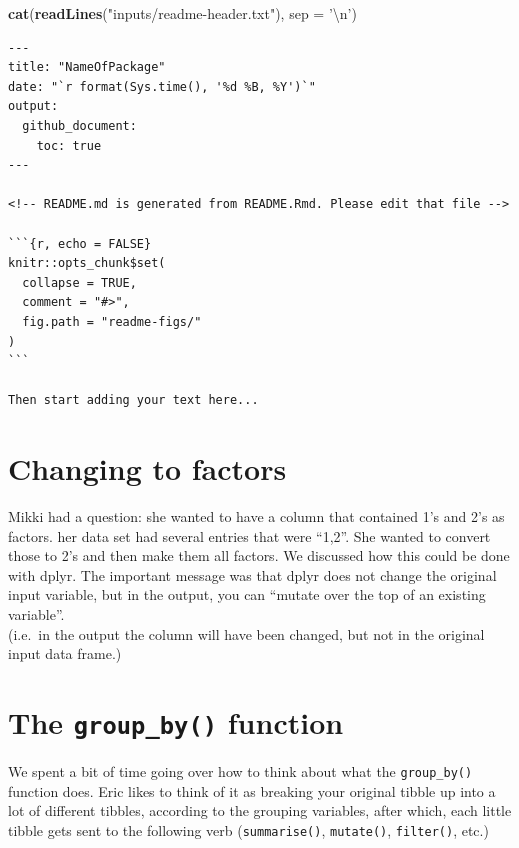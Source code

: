 \documentclass[]{book}
\newenvironment{Shaded}{\begin{snugshade}}{\end{snugshade}}
\newcommand{\KeywordTok}[1]{\textcolor[rgb]{0.13,0.29,0.53}{\textbf{{#1}}}}
\newcommand{\DataTypeTok}[1]{\textcolor[rgb]{0.13,0.29,0.53}{{#1}}}
\newcommand{\CharTok}[1]{\textcolor[rgb]{0.31,0.60,0.02}{{#1}}}
\newcommand{\StringTok}[1]{\textcolor[rgb]{0.31,0.60,0.02}{{#1}}}
\newcommand{\NormalTok}[1]{{#1}}
\theoremstyle{definition}
\theoremstyle{definition}
\theoremstyle{remark}
\begin{document}
\begin{Shaded}
\begin{Highlighting}[]
\KeywordTok{cat}\NormalTok{(}\KeywordTok{readLines}\NormalTok{(}\StringTok{"inputs/readme-header.txt"}\NormalTok{), }\DataTypeTok{sep =} \StringTok{'}\CharTok{\textbackslash{}n}\StringTok{'}\NormalTok{)}
\end{Highlighting}
\end{Shaded}

\begin{verbatim}
---
title: "NameOfPackage"
date: "`r format(Sys.time(), '%d %B, %Y')`"
output: 
  github_document:
    toc: true
---

<!-- README.md is generated from README.Rmd. Please edit that file -->

```{r, echo = FALSE}
knitr::opts_chunk$set(
  collapse = TRUE,
  comment = "#>",
  fig.path = "readme-figs/"
)
```

Then start adding your text here...
\end{verbatim}

\section{Changing to factors}\label{changing-to-factors}

Mikki had a question: she wanted to have a column that contained 1's and
2's as factors. her data set had several entries that were ``1,2''. She
wanted to convert those to 2's and then make them all factors. We
discussed how this could be done with dplyr. The important message was
that dplyr does not change the original input variable, but in the
output, you can ``mutate over the top of an existing variable''.\\
(i.e.~in the output the column will have been changed, but not in the
original input data frame.)

\section{\texorpdfstring{The \texttt{group\_by()}
function}{The group\_by() function}}\label{the-group_by-function}

We spent a bit of time going over how to think about what the
\texttt{group\_by()} function does. Eric likes to think of it as
breaking your original tibble up into a lot of different tibbles,
according to the grouping variables, after which, each little tibble
gets sent to the following verb (\texttt{summarise()},
\texttt{mutate()}, \texttt{filter()}, etc.)
\end{document}
